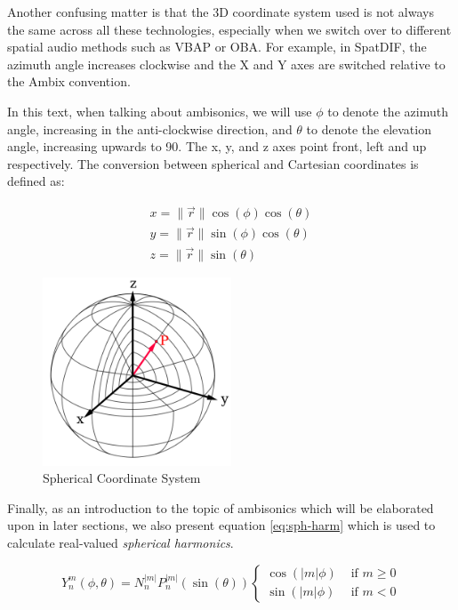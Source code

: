 Another confusing matter is that the 3D coordinate system used is not always the same across all these technologies, especially when we switch over to different spatial audio methods such as VBAP or OBA. For example, in SpatDIF, the azimuth angle increases clockwise and the X and Y axes are switched relative to the Ambix convention. 

In this text, when talking about ambisonics, we will use $\phi$ to denote the azimuth angle, increasing in the anti-clockwise direction, and $\theta$ to denote the elevation angle, increasing upwards to 90\textdegree. The x, y, and z axes point front, left and up respectively. The conversion between spherical and Cartesian coordinates is defined as: 

\begin{equation}
\begin{array}{l}
x=\|\vec{r}\| \cos (\phi) \cos (\theta) \\
y=\|\vec{r}\| \sin (\phi) \cos (\theta) \\
z=\|\vec{r}\| \sin (\theta)
\end{array}
\end{equation}

\begin{figure}[ht!]%
\centering
\includegraphics[width=0.5\textwidth]{img/sph-coord.png}
\caption{Spherical Coordinate System \cite{Spherica11online}}
\label{fig:sph-coord}
\end{figure}

Finally, as an introduction to the topic of ambisonics which will be elaborated upon in later sections, we also present equation \ref{eq:sph-harm} which is used to calculate real-valued \textit{spherical harmonics}.

\begin{equation}
Y_{n}^{m}(\phi, \theta)=N_{n}^{|m|} P_{n}^{|m|}(\sin (\theta))\left\{\begin{array}{ll}
\cos (|m| \phi) & \text { if } m \geq 0 \\
\sin (|m| \phi) & \text { if } m<0
\end{array}\right.
\label{eq:sph-harm}
\end{equation}

